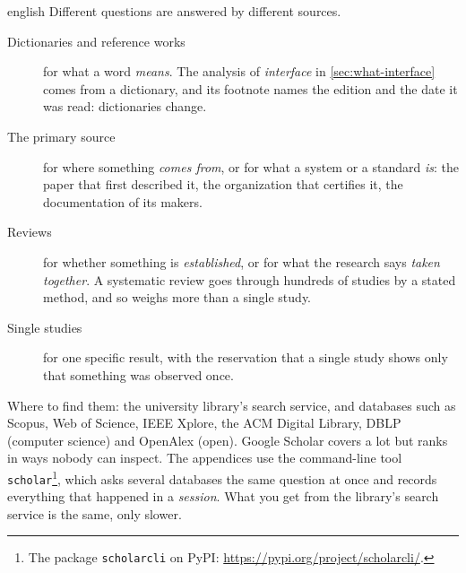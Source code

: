 \begin{onlyin}{english} %
Different questions are answered by different sources.
\begin{description}
  \item[Dictionaries and reference works] for what a word \emph{means}.
    The analysis of \emph{interface} in \cref{sec:what-interface} comes
    from a dictionary, and its footnote names the edition and the date
    it was read: dictionaries change.
  \item[The primary source] for where something \emph{comes from}, or
    for what a system or a standard \emph{is}: the paper that first
    described it, the organization that certifies it, the documentation
    of its makers.
  \item[Reviews] for whether something is \emph{established}, or for
    what the research says \emph{taken together}.  A systematic review
    goes through hundreds of studies by a stated method, and so weighs
    more than a single study.
  \item[Single studies] for one specific result, with the reservation
    that a single study shows only that something was observed once.
\end{description}
Where to find them: the university library's search service, and
databases such as Scopus, Web of Science, IEEE Xplore, the ACM Digital
Library, DBLP (computer science) and OpenAlex (open).  Google Scholar
covers a lot but ranks in ways nobody can inspect.  The appendices use
the command-line tool \texttt{scholar}\footnote{The package
\texttt{scholarcli} on PyPI:
\url{https://pypi.org/project/scholarcli/}.}, which asks several
databases the same question at once and records everything that
happened in a \emph{session}.  What you get from the library's search
service is the same, only slower.
\end{onlyin}
